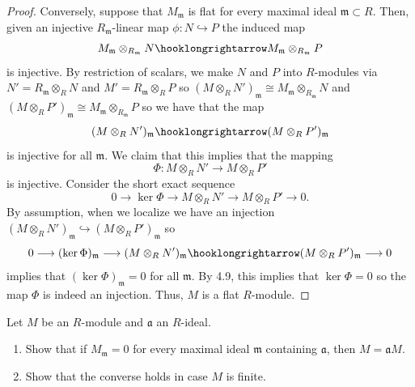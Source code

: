 \begin{proof}
Conversely, suppose that $M_{\mathfrak{m}}$ is flat for every
maximal ideal $\mathfrak{m}\subset R$. Then, given an
injective $R_{\mathfrak{m}}$-linear map $\phi\colon
N\hookrightarrow P$ the induced map
\[
M_{\mathfrak{m}}\otimes_{R_{\mathfrak{m}}} N\hooklongrightarrow
M_{\mathfrak{m}}\otimes_{R_{\mathfrak{m}}} P
\]
is injective. By restriction of scalars, we make $N$ and $P$ into
$R$-modules via $N'=R_{\mathfrak{m}}\otimes_R N$ and
$M'=R_{\mathfrak{m}}\otimes_R P$ so $(M\otimes_R
N')_{\mathfrak{m}}\cong M_{\mathfrak{m}}\otimes_{R_{\mathfrak{m}}} N$ and $(M\otimes_R
P')_{\mathfrak{m}}\cong
M_{\mathfrak{m}}\otimes_{R_{\mathfrak{m}}} P$ so we have that the map
\[
(M\otimes_R N')_{\mathfrak{m}}\hooklongrightarrow (M\otimes_R P')_{\mathfrak{m}}
\]
is injective for all $\mathfrak{m}$. We claim that this implies
that the mapping
\[
\Phi\colon M\otimes_R N'\longrightarrow M\otimes_R P'
\]
is injective. Consider the short exact sequence
\[
0\longrightarrow
\ker\Phi\longrightarrow
M\otimes_R N'\longrightarrow
M\otimes_R P'\longrightarrow
0.
\]
By assumption, when we localize we have an injection $(M\otimes_R
N')_{\mathfrak{m}}\hookrightarrow (M\otimes_R P')_{\mathfrak{m}}$ so
\[
0\longrightarrow
(\ker\Phi)_{\mathfrak{m}}\longrightarrow
(M\otimes_R N')_{\mathfrak{m}}\hooklongrightarrow
(M\otimes_R P')_{\mathfrak{m}}\longrightarrow
0
\]
implies that $(\ker\Phi)_{\mathfrak{m}}=0$ for all
$\mathfrak{m}$. By 4.9, this implies that $\ker\Phi=0$ so the map
$\Phi$ is indeed an injection. Thus, $M$ is a flat $R$-module.
\end{proof}
\newpage
\begin{problem}
Let $M$ be an $R$-module and $\mathfrak{a}$ an $R$-ideal.
\begin{enumerate}[noitemsep,label=(\alph*)]
\item Show that if $M_{\mathfrak{m}}=0$ for every maximal ideal
  $\mathfrak{m}$ containing $\mathfrak{a}$, then $M=\mathfrak{a}M$.
\item Show that the converse holds in case $M$ is finite.
\end{enumerate}
\end{problem}
